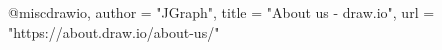 @misc{drawio,
    author    = "JGraph",
    title     = "About us - draw.io",
    url       = "https://about.draw.io/about-us/"
}